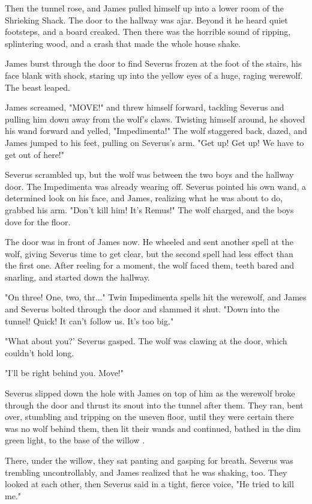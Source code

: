 Then the tunnel rose, and James pulled himself up into a lower room of the Shrieking Shack. The door to the hallway was ajar. Beyond it he heard quiet footsteps, and a board creaked. Then there was the horrible sound of ripping, splintering wood, and a crash that made the whole house shake.

James burst through the door to find Severus frozen at the foot of the stairs, his face blank with shock, staring up into the yellow eyes of a huge, raging werewolf. The beast leaped.

James screamed, "MOVE!" and threw himself forward, tackling Severus and pulling him down away from the wolf's claws. Twisting himself around, he shoved his wand forward and yelled, "Impedimenta!" The wolf staggered back, dazed, and James jumped to his feet, pulling on Severus's arm. "Get up! Get up! We have to get out of here!"

Severus scrambled up, but the wolf was between the two boys and the hallway door. The Impedimenta was already wearing off. Severus pointed his own wand, a determined look on his face, and James, realizing what he was about to do, grabbed his arm. "Don't kill him! It's Remus!" The wolf charged, and the boys dove for the floor.

The door was in front of James now. He wheeled and sent another spell at the wolf, giving Severus time to get clear, but the second spell had less effect than the first one. After reeling for a moment, the wolf faced them, teeth bared and snarling, and started down the hallway.

"On three! One, two, thr..." Twin Impedimenta spells hit the werewolf, and James and Severus bolted through the door and slammed it shut. "Down into the tunnel! Quick! It can't follow us. It's too big."

"What about you?' Severus gasped. The wolf was clawing at the door, which couldn't hold long.

"I'll be right behind you. Move!"

Severus slipped down the hole with James on top of him as the werewolf broke through the door and thrust its snout into the tunnel after them. They ran, bent over, stumbling and tripping on the uneven floor, until they were certain there was no wolf behind them, then lit their wands and continued, bathed in the dim green light, to the base of the willow .

There, under the willow, they sat panting and gasping for breath. Severus was trembling uncontrollably, and James realized that he was shaking, too. They looked at each other, then Severus said in a tight, fierce voice, "He tried to kill me."

